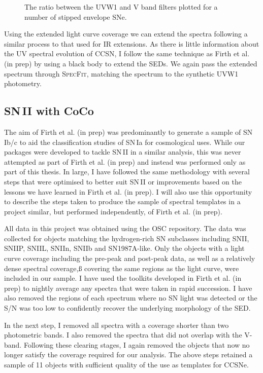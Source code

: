 \begin{figure}
  \caption{The ratio between the UVW1 and V band filters plotted for a number of stipped envelope SNe.}
  \label{fig:VvsUVW1}
\end{figure}

Using the extended light curve coverage we can extend the spectra following a similar process to that used for IR extensions. As there is little information about the UV spectral evolution of CCSN, I follow the same technique as Firth et al. (in prep) by using a black body to extend the SEDs. We again pass the extended spectrum through \textsc{SpecFit}, matching the spectrum to the synthetic UVW1 photometry.

\subsection{SN\,II with CoCo}
The aim of Firth et al. (in prep) was predominantly to generate a sample of SN\,Ib/c to aid the classification studies of SN\,Ia for cosmological uses. While our packages were developed to tackle SN\,II in a similar analysis, this was never attempted as part of Firth et al. (in prep) and instead was performed only as part of this thesis. In large, I have followed the same methodology with several steps that were optimised to better suit SN\,II or improvements based on the lessons we have learned in Firth et al. (in prep). I will also use this opportunity to describe the steps taken to produce the sample of spectral templates in a project similar, but performed independently, of Firth et al. (in prep).

All data in this project was obtained using the OSC repository. The data was collected for objects matching the hydrogen-rich SN subclasses including SNII, SNIIP, SNIIL, SNIIn, SNIIb and SN1987A-like. Only the objects with a light curve coverage including the pre-peak and post-peak data, as well as a relatively dense spectral coverage,ß        covering the same regions as the light curve, were included in our sample. I have used the toolkits developed in Firth et al. (in prep) to nightly average any spectra that were taken in rapid succession. I have also removed the regions of each spectrum where no SN light was detected or the S/N was too low to confidently recover the underlying morphology of the SED.

In the next step, I removed all spectra with a coverage shorter than two photometric bands. I also removed the spectra that did not overlap with the V-band. Following these clearing stages, I again removed the objects that now no longer satisfy the coverage required for our analysis. The above steps retained a sample of 11 objects with sufficient quality of the use as templates for CCSNe.

